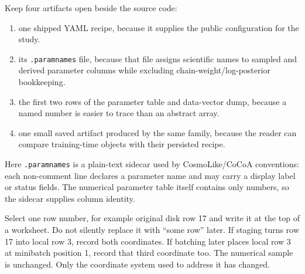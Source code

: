 \documentclass[10pt,aps,prd,twocolumn,nofootinbib]{revtex4-2}
\newcommand{\code}[1]{\texttt{#1}}
\begin{document}
Keep four artifacts open beside the source code:
\begin{enumerate}
  \item one shipped YAML recipe, because it supplies the public configuration
        for the study.
  \item its \code{.paramnames} file, because that file assigns scientific
        names to sampled and derived parameter columns while excluding
        chain-weight/log-posterior bookkeeping.
  \item the first two rows of the parameter table and data-vector dump, because
        a named number is easier to trace than an abstract array.
  \item one small saved artifact produced by the same family, because the
        reader can compare training-time objects with their persisted recipe.
\end{enumerate}
Here \code{.paramnames} is a plain-text sidecar used by CosmoLike/CoCoA
conventions: each non-comment line declares a
parameter name and may carry a display label or status fields.  The numerical
parameter table itself contains only numbers, so the sidecar supplies column
identity.

Select one row number, for example original disk row 17 and write it at the
top of a worksheet.  Do not silently replace it with ``some row'' later.  If
staging turns row 17 into local row 3, record both coordinates.  If batching
later places local row 3 at minibatch position 1, record that third coordinate
too.  The numerical sample is unchanged.  Only the coordinate system used to
address it has changed.
\end{document}
